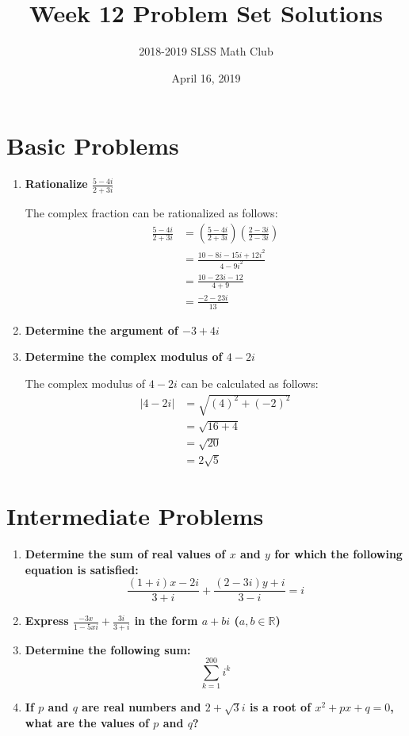 \documentclass[12pt]{article}
\title{Week 12 Problem Set Solutions\vspace{-3mm}}
\author{2018-2019 SLSS Math Club\vspace{-5mm}}
\date{April 16, 2019\vspace{-5mm}}
\begin{document}
\maketitle

\section*{Basic Problems}
\begin{enumerate}
    \item \textbf{Rationalize $\displaystyle{\frac{5 - 4i}{2 + 3i}}$}
    
    The complex fraction can be rationalized as follows:
    \begin{align*}
        \frac{5 - 4i}{2 + 3i} &= (\frac{5 - 4i}{2 + 3i})(\frac{2 - 3i}{2 - 3i}) \\
        &= \frac{10 - 8i - 15i + 12i^2}{4 - 9i^2} \\
        &= \frac{10 - 23i - 12}{4 + 9} \\
        &= \frac{-2 - 23i}{13}
    \end{align*}
    
    \item \textbf{Determine the argument of $-3 + 4i$}
    
    \item \textbf{Determine the complex modulus of $4 - 2i$}
    
    The complex modulus of $4 - 2i$ can be calculated as follows:
    \begin{align*}
        |4 - 2i| &= \sqrt{(4)^2 + (-2)^2} \\
                &= \sqrt{16 + 4} \\
                &= \sqrt{20} \\
                &= 2\sqrt{5}
    \end{align*}
\end{enumerate}


\section*{Intermediate Problems}
\begin{enumerate}
    \item \textbf{Determine the sum of real values of $x$ and $y$ for which the following equation is satisfied: $$\frac{(1+i)x-2i}{3+i} + \frac{(2-3i)y+i}{3-i} = i$$}
    \item \textbf{Express $\displaystyle{\frac{-3x}{1 - 5xi} + \frac{3i}{3 + i}}$ in the form $a + bi$ ($a, b \in \mathbb{R}$)}
    \item \textbf{Determine the following sum: $$\sum_{k = 1}^{200} i^k$$}
    \item \textbf{If $p$ and $q$ are real numbers and $2+\sqrt{3}i$ is a root of $x^2+px+q=0$, what are the values of $p$ and $q$?}
\end{enumerate}
\end{document}
